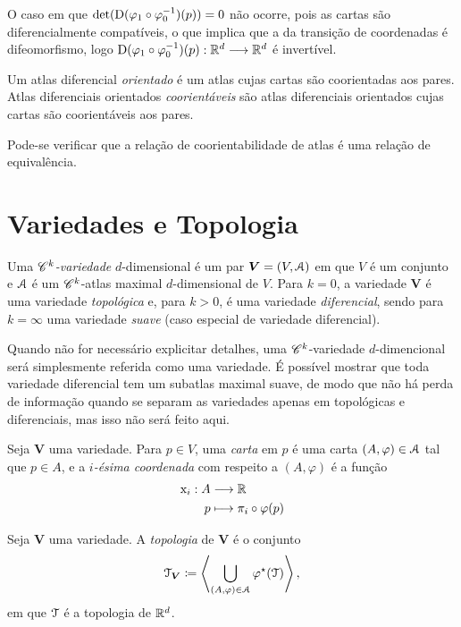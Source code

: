 O caso em que $\det(\mathrm{D}(\varphi_1 \circ \varphi_0^{-1})(p))=0$ não ocorre, pois as cartas são diferencialmente compatíveis, o que implica que a da transição de coordenadas é difeomorfismo, logo $\mathrm{D}(\varphi_1 \circ \varphi_0^{-1})(p): \mathbb{R}^d \longrightarrow \mathbb{R}^d$ é invertível.

\begin{defi}
Um atlas diferencial \emph{orientado} é um atlas cujas cartas são coorientadas aos pares. Atlas diferenciais orientados \emph{coorientáveis} são atlas diferenciais orientados cujas cartas são coorientáveis aos pares.
\end{defi}

Pode-se verificar que a relação de coorientabilidade de atlas é uma relação de equivalência.

\section{Variedades e Topologia}

\begin{defi}
Uma \emph{$\mathscr{C}^k$-variedade} $d$-dimensional é um par $\bm V=(V,\mathcal{A})$ em que $V$ é um conjunto e $\mathcal{A}$ é um $\mathscr{C}^k$-atlas maximal $d$-dimensional de $V$. Para $k=0$, a variedade $\bm V$ é uma variedade \emph{topológica} e, para $k>0$, é uma variedade \emph{diferencial}, sendo para $k=\infty$ uma variedade \emph{suave} (caso especial de variedade diferencial).
\end{defi}

Quando não for necessário explicitar detalhes, uma $\mathscr{C}^k$-variedade $d$-dimencional será simplesmente referida como uma variedade. É possível mostrar que toda variedade diferencial tem um subatlas maximal suave, de modo que não há perda de informação quando se separam as variedades apenas em topológicas e diferenciais, mas isso não será feito aqui.

\begin{defi}
Seja $\bm V$ uma variedade. Para $p \in V$, uma \emph{carta} em $p$ é uma carta $(A,\varphi) \in \mathcal{A}$ tal que $p \in A$, e a \emph{$i$-ésima coordenada} com respeito a $(A,\varphi)$ é a função
	\begin{align*}
	{\mathrm{x}_i}: {A} &\longrightarrow {\mathbb{R}} \\{p} &\longmapsto {\pi_i \circ \varphi(p)}
	\end{align*}
\end{defi}

\begin{defi}
Seja $\bm V$ uma variedade. A \emph{topologia} de $\bm V$ é o conjunto
	\begin{equation*}
	\mathcal{T}_{\bm V} \coloneqq \left\langle \bigcup_{(A,\varphi) \in \mathcal{A}} \varphi^\star(\mathcal{T}) \right\rangle,
	\end{equation*}
em que $\mathcal{T}$ é a topologia de $\mathbb{R}^d$.
\end{defi}

